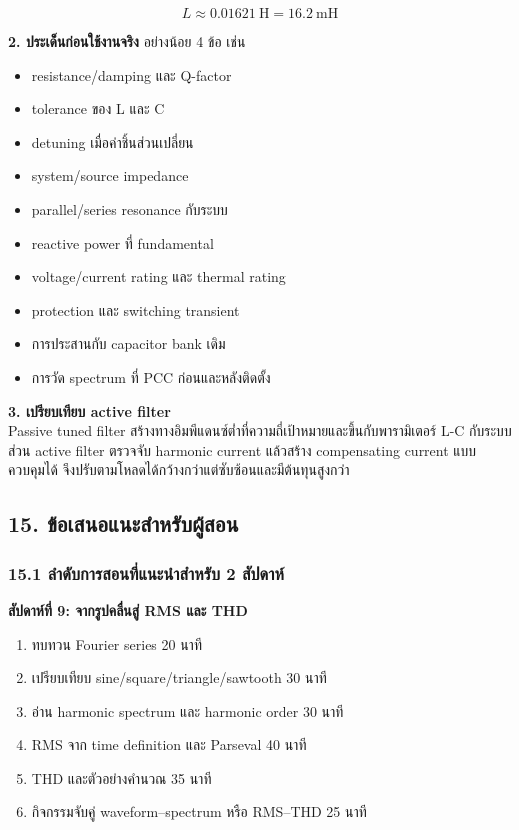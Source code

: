 \[
L\approx0.01621\ \text{H}=16.2\ \text{mH}
\]

\textbf{2. ประเด็นก่อนใช้งานจริง} อย่างน้อย 4 ข้อ เช่น

\begin{itemize}
    \item resistance/damping และ Q-factor
    \item tolerance ของ L และ C
    \item detuning เมื่อค่าชิ้นส่วนเปลี่ยน
    \item system/source impedance
    \item parallel/series resonance กับระบบ
    \item reactive power ที่ fundamental
    \item voltage/current rating และ thermal rating
    \item protection และ switching transient
    \item การประสานกับ capacitor bank เดิม
    \item การวัด spectrum ที่ PCC ก่อนและหลังติดตั้ง
\end{itemize}

\textbf{3. เปรียบเทียบ active filter} \\
Passive tuned filter สร้างทางอิมพีแดนซ์ต่ำที่ความถี่เป้าหมายและขึ้นกับพารามิเตอร์ L-C กับระบบ ส่วน active filter ตรวจจับ harmonic current แล้วสร้าง compensating current แบบควบคุมได้ จึงปรับตามโหลดได้กว้างกว่าแต่ซับซ้อนและมีต้นทุนสูงกว่า



\subsection{15. ข้อเสนอแนะสำหรับผู้สอน}

\subsubsection{15.1 ลำดับการสอนที่แนะนำสำหรับ 2 สัปดาห์}

\textbf{สัปดาห์ที่ 9: จากรูปคลื่นสู่ RMS และ THD}

\begin{enumerate}
    \item ทบทวน Fourier series 20 นาที
    \item เปรียบเทียบ sine/square/triangle/sawtooth 30 นาที
    \item อ่าน harmonic spectrum และ harmonic order 30 นาที
    \item RMS จาก time definition และ Parseval 40 นาที
    \item THD และตัวอย่างคำนวณ 35 นาที
    \item กิจกรรมจับคู่ waveform–spectrum หรือ RMS–THD 25 นาที
\end{enumerate}

